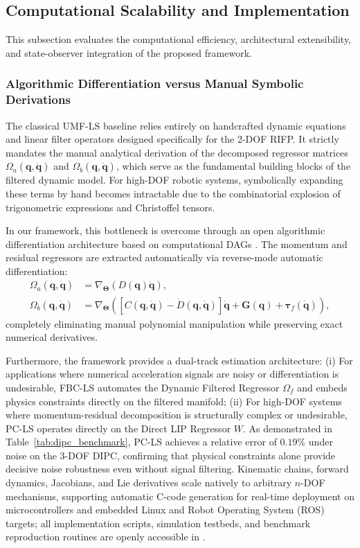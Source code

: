 \documentclass[lettersize,journal]{IEEEtran}
\begin{document}
\subsection{Computational Scalability and Implementation}
\label{sec:computational_scalability}
This subsection evaluates the computational efficiency, architectural extensibility, and state-observer integration of the proposed framework.

\subsubsection{Algorithmic Differentiation versus Manual Symbolic Derivations}
The classical UMF-LS baseline \cite{GarciaAlarcon2012, AguilarSierra2014} relies entirely on handcrafted dynamic equations and linear filter operators designed specifically for the 2-DOF RIFP. It strictly mandates the manual analytical derivation of the decomposed regressor matrices $\Omega_a(\bm{q}, \dot{\bm{q}})$ and $\Omega_b(\bm{q}, \dot{\bm{q}})$, which serve as the fundamental building blocks of the filtered dynamic model. For high-DOF robotic systems, symbolically expanding these terms by hand becomes intractable due to the combinatorial explosion of trigonometric expressions and Christoffel tensors.

In our framework, this bottleneck is overcome through an open algorithmic differentiation architecture based on computational DAGs \cite{Andersson2019}. The momentum and residual regressors are extracted automatically via reverse-mode automatic differentiation:
\begin{align}
    \Omega_a(\bm{q}, \dot{\bm{q}}) &= \nabla_{\bm{\Theta}} \left( D(\bm{q})\dot{\bm{q}} \right), \\
    \Omega_b(\bm{q}, \dot{\bm{q}}) &= \nabla_{\bm{\Theta}} \left( \left[C(\bm{q}, \dot{\bm{q}}) - \dot{D}(\bm{q}, \dot{\bm{q}})\right]\dot{\bm{q}} + \bm{G}(\bm{q}) + \bm{\tau}_f(\dot{\bm{q}}) \right),
\end{align}
completely eliminating manual polynomial manipulation while preserving exact numerical derivatives.

Furthermore, the framework provides a dual-track estimation architecture:
(i) For applications where numerical acceleration signals are noisy or differentiation is undesirable, FBC-LS automates the Dynamic Filtered Regressor $\Omega_f$ and embeds physics constraints directly on the filtered manifold;
(ii) For high-DOF systems where momentum-residual decomposition is structurally complex or undesirable, PC-LS operates directly on the Direct LIP Regressor $W$. As demonstrated in Table~\ref{tab:dipc_benchmark}, PC-LS achieves a relative error of $0.19\%$ under noise on the 3-DOF DIPC, confirming that physical constraints alone provide decisive noise robustness even without signal filtering. Kinematic chains, forward dynamics, Jacobians, and Lie derivatives scale natively to arbitrary $n$-DOF mechanisms, supporting automatic C-code generation for real-time deployment on microcontrollers and embedded Linux and Robot Operating System (ROS) targets; all implementation scripts, simulation testbeds, and benchmark reproduction routines are openly accessible in \cite{AskerRepo2026}.
\end{document}
